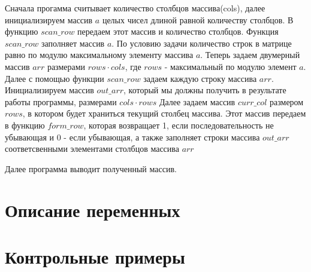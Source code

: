 \documentclass[a4paper,12pt]{report}
\begin{document}
Сначала прогамма считывает количество столбцов массива(cols), далее инициализируем массив $a$ целых чисел длиной равной количеству столбцов. 
В функцию $scan\_row$ передаем этот массив и количество столбцов. 
Функция $scan\_row$ заполняет массив $a$.
По условию задачи количество строк в матрице равно по модулю максимальному элементу массива $a$.
Теперь задаем двумерный массив $arr$ размерами $rows \cdot cols$, где $rows$ - максимальный по модулю элемент $a$.
Далее с помощью функции $scan\_row$ задаем каждую строку массива $arr$.
Инициализируем массив $out\_arr$, который мы должны получить в результате работы программы, размерами $cols \cdot rows$
Далее задаем массив $curr\_col$ размером $rows$, в котором будет храниться текущий столбец массива. Этот массив передаем в функцию $form\_row$,
которая возвращает 1, если последовательность не убывающая и 0 - если убывающая, а также заполняет строки массива $out\_arr$
соответсвенными элементами столбцов массива $arr$

Далее программа выводит полученный массив.


\section*{Описание переменных}
\begin{centering}
\end{centering}

\section*{Контрольные примеры}
\end{document}
